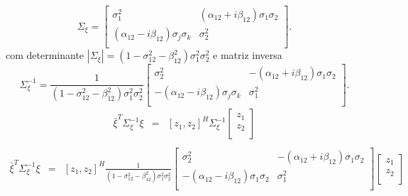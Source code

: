 $$
\Sigma_{\xi} = \left[
\begin{array}{cc}
	\sigma_1^2                                &  (\alpha_{12}+i\beta_{12})\sigma_1\sigma_2  \\
	(\alpha_{12}-i\beta_{12})\sigma_j\sigma_k & \sigma_2^2 \\
\end{array}
\right].
$$
com determinante $|\Sigma_{\xi}|=(1 - \sigma_{12}^{2}- \beta_{12}^2)\sigma_{1}^2\sigma_{2}^2$ e  matriz inversa 
$$
\Sigma_{\xi}^{-1} =\frac{1}{(1 - \sigma_{12}^{2}- \beta_{12}^2)\sigma_{1}^2\sigma_{2}^2} \left[
\begin{array}{cc}
	\sigma_2^2                                &  -(\alpha_{12}+i\beta_{12})\sigma_1\sigma_2  \\
	-(\alpha_{12}-i\beta_{12})\sigma_j\sigma_k & \sigma_1^2 \\
\end{array}
\right].
$$
\begin{equation}\label{eqn72}
\begin{array}{ccc}
	\bar{\xi}^{T}\Sigma_{\xi}^{-1}\xi&=&[z_1,z_2]^{H}\Sigma_{\xi}^{-1}
	\left[
\begin{array}{c}
	z_1  \\
	z_2 \\
\end{array}\right]\\
\end{array}
\end{equation}
\begin{equation}\label{eqn73}
\begin{array}{ccc}
	\bar{\xi}^{T}\Sigma_{\xi}^{-1}\xi&=&[z_1,z_2]^{H}\frac{1}{(1 - \sigma_{12}^{2}- \beta_{12}^2)\sigma_{1}^2\sigma_{2}^2} \left[
\begin{array}{cc}
	\sigma_2^2                                &  -(\alpha_{12}+i\beta_{12})\sigma_1\sigma_2  \\
	-(\alpha_{12}-i\beta_{12})\sigma_1\sigma_2 & \sigma_1^2 \\
\end{array}
\right]
	\left[
\begin{array}{c}
	z_1  \\
	z_2 \\
\end{array}\right]\\
\end{array}
\end{equation}


